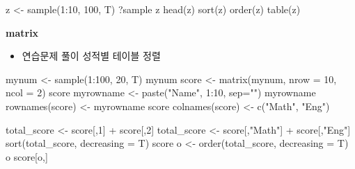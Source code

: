 \documentclass[
]{book}
\newenvironment{Shaded}{\begin{snugshade}}{\end{snugshade}}
\newcommand{\AttributeTok}[1]{\textcolor[rgb]{0.77,0.63,0.00}{#1}}
\newcommand{\DecValTok}[1]{\textcolor[rgb]{0.00,0.00,0.81}{#1}}
\newcommand{\FunctionTok}[1]{\textcolor[rgb]{0.00,0.00,0.00}{#1}}
\newcommand{\NormalTok}[1]{#1}
\newcommand{\OtherTok}[1]{\textcolor[rgb]{0.56,0.35,0.01}{#1}}
\newcommand{\SpecialCharTok}[1]{\textcolor[rgb]{0.00,0.00,0.00}{#1}}
\newcommand{\StringTok}[1]{\textcolor[rgb]{0.31,0.60,0.02}{#1}}
\providecommand{\tightlist}{%
  \setlength{\itemsep}{0pt}\setlength{\parskip}{0pt}}
\begin{document}
\begin{Shaded}
\begin{Highlighting}[]
\NormalTok{z }\OtherTok{\textless{}{-}} \FunctionTok{sample}\NormalTok{(}\DecValTok{1}\SpecialCharTok{:}\DecValTok{10}\NormalTok{, }\DecValTok{100}\NormalTok{, T)}
\NormalTok{?sample}
\NormalTok{z}
\FunctionTok{head}\NormalTok{(z)}
\FunctionTok{sort}\NormalTok{(z)}
\FunctionTok{order}\NormalTok{(z)}
\FunctionTok{table}\NormalTok{(z)}
\end{Highlighting}
\end{Shaded}

\textbf{matrix}

\begin{itemize}
\tightlist
\item
  연습문제 풀이 성적별 테이블 정렬
\end{itemize}

\begin{Shaded}
\begin{Highlighting}[]
\NormalTok{mynum }\OtherTok{\textless{}{-}} \FunctionTok{sample}\NormalTok{(}\DecValTok{1}\SpecialCharTok{:}\DecValTok{100}\NormalTok{, }\DecValTok{20}\NormalTok{, T)}
\NormalTok{mynum}
\NormalTok{score }\OtherTok{\textless{}{-}} \FunctionTok{matrix}\NormalTok{(mynum, }\AttributeTok{nrow =} \DecValTok{10}\NormalTok{, }\AttributeTok{ncol =} \DecValTok{2}\NormalTok{)}
\NormalTok{score}
\NormalTok{myrowname }\OtherTok{\textless{}{-}} \FunctionTok{paste}\NormalTok{(}\StringTok{"Name"}\NormalTok{, }\DecValTok{1}\SpecialCharTok{:}\DecValTok{10}\NormalTok{, }\AttributeTok{sep=}\StringTok{""}\NormalTok{)}
\NormalTok{myrowname}
\FunctionTok{rownames}\NormalTok{(score) }\OtherTok{\textless{}{-}}\NormalTok{ myrowname}
\NormalTok{score}
\FunctionTok{colnames}\NormalTok{(score) }\OtherTok{\textless{}{-}} \FunctionTok{c}\NormalTok{(}\StringTok{"Math"}\NormalTok{, }\StringTok{"Eng"}\NormalTok{)}

\NormalTok{total\_score }\OtherTok{\textless{}{-}}\NormalTok{ score[,}\DecValTok{1}\NormalTok{] }\SpecialCharTok{+}\NormalTok{ score[,}\DecValTok{2}\NormalTok{]}
\NormalTok{total\_score }\OtherTok{\textless{}{-}}\NormalTok{ score[,}\StringTok{"Math"}\NormalTok{] }\SpecialCharTok{+}\NormalTok{ score[,}\StringTok{"Eng"}\NormalTok{]}
\FunctionTok{sort}\NormalTok{(total\_score, }\AttributeTok{decreasing =}\NormalTok{ T)}
\NormalTok{score}
\NormalTok{o }\OtherTok{\textless{}{-}} \FunctionTok{order}\NormalTok{(total\_score, }\AttributeTok{decreasing =}\NormalTok{ T)}
\NormalTok{o}
\NormalTok{score[o,]}
\end{Highlighting}
\end{Shaded}
\end{document}

